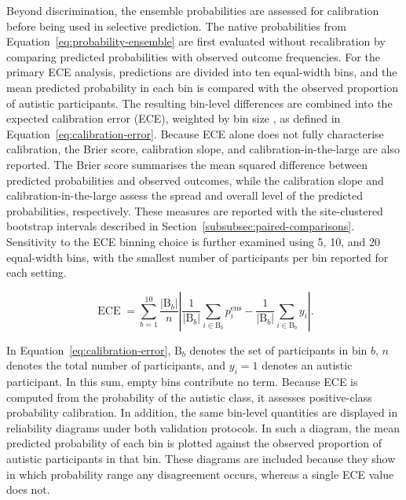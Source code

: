 Beyond discrimination, the ensemble probabilities are assessed for calibration before being used in selective prediction. The native probabilities from Equation~\eqref{eq:probability-ensemble} are first evaluated without recalibration by comparing predicted probabilities with observed outcome frequencies. For the primary ECE analysis, predictions are divided into ten equal-width bins, and the mean predicted probability in each bin is compared with the observed proportion of autistic participants. The resulting bin-level differences are combined into the expected calibration error (ECE), weighted by bin size \citep{Naeinietal2015,Guoetal2017}, as defined in Equation~\eqref{eq:calibration-error}. Because ECE alone does not fully characterise calibration, the Brier score, calibration slope, and calibration-in-the-large are also reported. The Brier score summarises the mean squared difference between predicted probabilities and observed outcomes, while the calibration slope and calibration-in-the-large assess the spread and overall level of the predicted probabilities, respectively. These measures are reported with the site-clustered bootstrap intervals described in Section~\ref{subsubsec:paired-comparisons}. Sensitivity to the ECE binning choice is further examined using 5, 10, and 20 equal-width bins, with the smallest number of participants per bin reported for each setting.

\begin{equation}
\operatorname{ECE}
=
\sum_{b=1}^{10}
\frac{|\mathrm{B}_b|}{n}
\left|
\frac{1}{|\mathrm{B}_b|}
\sum_{i\in\mathrm{B}_b}p_i^{\mathrm{ens}}
-
\frac{1}{|\mathrm{B}_b|}
\sum_{i\in\mathrm{B}_b}y_i
\right|.
\label{eq:calibration-error}
\end{equation}

In Equation~\eqref{eq:calibration-error}, $\mathrm{B}_b$ denotes the set of participants in bin $b$,
$n$ denotes the total number of participants, and $y_i=1$ denotes an autistic participant.
In this sum, empty bins contribute no term. Because ECE is computed from the probability of
the autistic class, it assesses positive-class probability calibration. In addition, the
same bin-level quantities are displayed in reliability diagrams under both validation
protocols. In such a diagram, the mean predicted probability of each bin is plotted against
the observed proportion of autistic participants in that bin. These diagrams are included
because they show in which probability range any disagreement occurs, whereas a single ECE
value does not.


